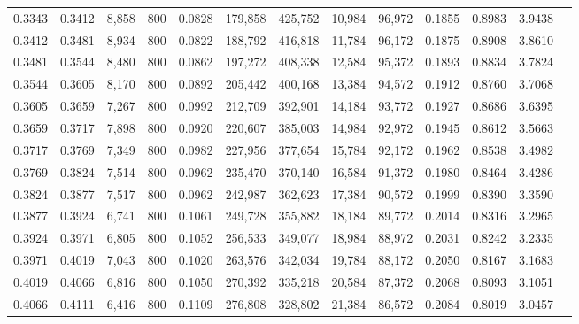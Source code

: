 \begin{tabular}{rrrrrrrrrrrrr}
0.3343 & 0.3412 &  8,858 & 800 &                                     0.0828 & 179,858 & 425,752 &  10,984 &  96,972 & 0.1855 & 0.8983 & 3.9438 \\
0.3412 & 0.3481 &  8,934 & 800 &                                     0.0822 & 188,792 & 416,818 &  11,784 &  96,172 & 0.1875 & 0.8908 & 3.8610 \\
0.3481 & 0.3544 &  8,480 & 800 &                                     0.0862 & 197,272 & 408,338 &  12,584 &  95,372 & 0.1893 & 0.8834 & 3.7824 \\
0.3544 & 0.3605 &  8,170 & 800 &                                     0.0892 & 205,442 & 400,168 &  13,384 &  94,572 & 0.1912 & 0.8760 & 3.7068 \\
0.3605 & 0.3659 &  7,267 & 800 &                                     0.0992 & 212,709 & 392,901 &  14,184 &  93,772 & 0.1927 & 0.8686 & 3.6395 \\
0.3659 & 0.3717 &  7,898 & 800 &                                     0.0920 & 220,607 & 385,003 &  14,984 &  92,972 & 0.1945 & 0.8612 & 3.5663 \\
0.3717 & 0.3769 &  7,349 & 800 &                                     0.0982 & 227,956 & 377,654 &  15,784 &  92,172 & 0.1962 & 0.8538 & 3.4982 \\
0.3769 & 0.3824 &  7,514 & 800 &                                     0.0962 & 235,470 & 370,140 &  16,584 &  91,372 & 0.1980 & 0.8464 & 3.4286 \\
0.3824 & 0.3877 &  7,517 & 800 &                                     0.0962 & 242,987 & 362,623 &  17,384 &  90,572 & 0.1999 & 0.8390 & 3.3590 \\
0.3877 & 0.3924 &  6,741 & 800 &                                     0.1061 & 249,728 & 355,882 &  18,184 &  89,772 & 0.2014 & 0.8316 & 3.2965 \\
0.3924 & 0.3971 &  6,805 & 800 &                                     0.1052 & 256,533 & 349,077 &  18,984 &  88,972 & 0.2031 & 0.8242 & 3.2335 \\
0.3971 & 0.4019 &  7,043 & 800 &                                     0.1020 & 263,576 & 342,034 &  19,784 &  88,172 & 0.2050 & 0.8167 & 3.1683 \\
0.4019 & 0.4066 &  6,816 & 800 &                                     0.1050 & 270,392 & 335,218 &  20,584 &  87,372 & 0.2068 & 0.8093 & 3.1051 \\
0.4066 & 0.4111 &  6,416 & 800 &                                     0.1109 & 276,808 & 328,802 &  21,384 &  86,572 & 0.2084 & 0.8019 & 3.0457 \\

\end{tabular}
